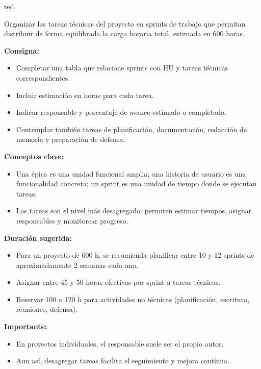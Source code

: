 \documentclass[
11pt, %
]{charter}
\begin{document}
\begin{consigna}{red} %

Organizar las tareas técnicas del proyecto en sprints de trabajo que permitan distribuir de forma equilibrada la carga horaria total, estimada en 600 horas.

\textbf{Consigna:}
\begin{itemize}
  \item Completar una tabla que relacione sprints con HU y tareas técnicas correspondientes.
  \item Incluir estimación en horas para cada tarea.
  \item Indicar responsable y porcentaje de avance estimado o completado.
  \item Contemplar también tareas de planificación, documentación, redacción de memoria y preparación de defensa.
\end{itemize}

\textbf{Conceptos clave:}
\begin{itemize}
  \item Una \'{e}pica es una unidad funcional amplia; una historia de usuario es una funcionalidad concreta; un sprint es una unidad de tiempo donde se ejecutan tareas.
  \item Las tareas son el nivel más desagregado: permiten estimar tiempos, asignar responsables y monitorear progreso.
\end{itemize}

\textbf{Duración sugerida:}
\begin{itemize}
  \item Para un proyecto de 600 h, se recomienda planificar entre 10 y 12 sprints de aproximadamente 2 semanas cada uno.
  \item Asignar entre 45 y 50 horas efectivas por sprint a tareas técnicas.
  \item Reservar 100 a 120 h para actividades no técnicas (planificación, escritura, reuniones, defensa).
\end{itemize}

\textbf{Importante:}
\begin{itemize}
  \item En proyectos individuales, el responsable suele ser el propio autor.
  \item Aun así, desagregar tareas facilita el seguimiento y mejora continua.
\end{itemize}


\end{consigna}
\end{document}
